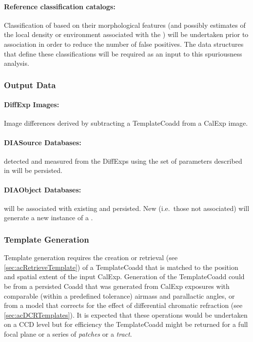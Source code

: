 \paragraph*{Reference classification catalogs:} Classification of \DIASources based on their morphological features (and possibly estimates of the local density or  environment associated with the \DIASource) will be undertaken prior to association in order to reduce the number of false positives. The data structures that define these classifications will be required as an input to this spuriousness analysis.



\subsubsection{Output Data}
\label{sec:apAGOutput}

\paragraph*{DiffExp Images:} Image differences derived by subtracting a TemplateCoadd from a CalExp image.

\paragraph*{DIASource Databases:} \DIASources detected and measured from the DiffExps using the set of parameters described in \DPDD will be persisted.


\paragraph*{DIAObject Databases:} \DIASource will be associated with existing \DIAObjects and persisted. New \DIASource (i.e.\ those not associated) will generate a new instance of a \DIAObject.


\subsubsection{Template Generation}
\label{sec:apCRTemplates}

Template generation requires the creation or retrieval (see \ref{sec:acRetrieveTemplate}) of a TemplateCoadd that is matched to the position and spatial extent of the input CalExp. Generation of the TemplateCoadd could be from a persisted Coadd that was generated from CalExp exposures with comparable (within a predefined tolerance) airmass and parallactic angles, or from a model that corrects for the effect of  differential chromatic refraction (see \ref{sec:acDCRTemplates}). It is expected that these operations would be undertaken on a CCD level but for efficiency the TemplateCoadd might be returned for a full focal plane or a series of \textit{patches}  or a \textit{tract}.


